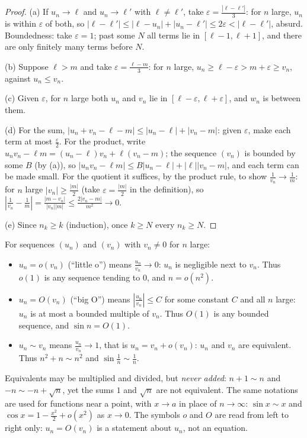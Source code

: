 \begin{proof}
(a) If $u_n\to\ell$ and $u_n\to\ell'$ with $\ell\ne\ell'$, take $\varepsilon=\frac{|\ell-\ell'|}3$: for $n$ large, $u_n$ is within $\varepsilon$ of both,
so $|\ell-\ell'|\le|\ell-u_n|+|u_n-\ell'|\le2\varepsilon<|\ell-\ell'|$, absurd. Boundedness: take $\varepsilon=1$; past some $N$ all terms lie in
$[\ell-1,\ell+1]$, and there are only finitely many terms before $N$.

(b) Suppose $\ell>m$ and take $\varepsilon=\frac{\ell-m}3$: for $n$ large, $u_n\ge\ell-\varepsilon>m+\varepsilon\ge v_n$, against $u_n\le v_n$.

(c) Given $\varepsilon$, for $n$ large both $u_n$ and $v_n$ lie in $[\ell-\varepsilon,\ell+\varepsilon]$, and $w_n$ is between them.

(d) For the sum, $|u_n+v_n-\ell-m|\le|u_n-\ell|+|v_n-m|$: given $\varepsilon$, make each term at most $\frac\varepsilon2$. For the product, write
$u_nv_n-\ell m=(u_n-\ell)v_n+\ell(v_n-m)$; the sequence $(v_n)$ is bounded by some $B$ (by (a)), so $|u_nv_n-\ell m|\le B|u_n-\ell|+|\ell||v_n-m|$,
and each term can be made small. For the quotient it suffices, by the product rule, to show $\frac1{v_n}\to\frac1m$: for $n$ large $|v_n|\ge\frac{|m|}2$
(take $\varepsilon=\frac{|m|}2$ in the definition), so $\left|\frac1{v_n}-\frac1m\right|=\frac{|m-v_n|}{|v_n||m|}\le\frac{2|v_n-m|}{m^2}\to0$.

(e) Since $n_k\ge k$ (induction), once $k\ge N$ every $n_k\ge N$.
\end{proof}

\begin{reminder}
For sequences $(u_n)$ and $(v_n)$ with $v_n\ne0$ for $n$ large:
\begin{itemize}
\item $u_n=o(v_n)$ (``little o'') means $\frac{u_n}{v_n}\to0$: $u_n$ is negligible next to $v_n$. Thus $o(1)$ is any sequence tending to $0$, and $n=o(n^2)$.
\item $u_n=O(v_n)$ (``big O'') means $\left|\frac{u_n}{v_n}\right|\le C$ for some constant $C$ and all $n$ large: $u_n$ is at most a bounded multiple of $v_n$. Thus $O(1)$ is any bounded sequence, and $\sin n=O(1)$.
\item $u_n\sim v_n$ means $\frac{u_n}{v_n}\to1$, that is $u_n=v_n+o(v_n)$: $u_n$ and $v_n$ are equivalent. Thus $n^2+n\sim n^2$ and $\sin\frac1n\sim\frac1n$.
\end{itemize}
Equivalents may be multiplied and divided, but \emph{never added}: $n+1\sim n$ and $-n\sim-n+\sqrt n$, yet the sums $1$ and $\sqrt n$ are not equivalent. The
same notations are used for functions near a point, with $x\to a$ in place of $n\to\infty$: $\sin x\sim x$ and $\cos x=1-\frac{x^2}2+o(x^2)$ as $x\to0$.
The symbols $o$ and $O$ are read from left to right only: $u_n=O(v_n)$ is a statement about $u_n$, not an equation.
\end{reminder}

